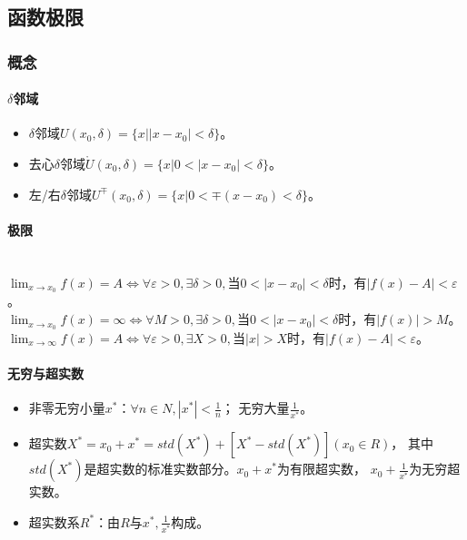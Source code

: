 \documentclass[
12pt, %
a4paper, 
oneside, %
headinclude,footinclude, %
]{scrartcl}
\begin{document}
\subsection[函数极限]{函数极限}
\subsubsection[概念]{概念}
\paragraph{$ \delta $邻域}
\begin{itemize}
\item $ \delta $邻域$ U(x_0, \delta) = \{x||x - x_0| < \delta\} $。
\item 去心$ \delta $邻域$ \mathring{U}(x_0, \delta) = \{x|0 < |x -x _0| < \delta\} $。
\item 左/右$ \delta $邻域$ U^{\mp}(x_0, \delta) = \{x|0 < \mp (x - x_0) < \delta\} $。
\end{itemize}
\paragraph{极限}~\\
$ \lim_{x \to x_0} f(x) = A \Leftrightarrow \forall \varepsilon > 0, \exists \delta > 0, $当$ 0 < |x - x_0|< \delta $时，有$ |f(x) - A| < \varepsilon $。 \\
$ \lim_{x \to x_0} f(x) = \infty \Leftrightarrow \forall M > 0, \exists \delta > 0, $当$ 0 < |x - x_0|< \delta $时，有$ |f(x)| > M $。 \\
$ \lim_{x \to \infty} f(x) = A \Leftrightarrow \forall \varepsilon > 0, \exists X > 0, $当$ |x|> X $时，有$ |f(x) - A| < \varepsilon $。
\paragraph{无穷与超实数}
\begin{itemize}
\item 非零无穷小量$ x^* $：$ \forall n \in N, |x^*| < \frac{1}{n} $；
无穷大量$ \frac{1}{x^*} $。
\item 超实数$ X^* = x_0 + x^* = std(X^*) + [X^* - std(X^*)](x_0 \in R) $，
其中$ std(X^*) $是超实数的标准实数部分。$ x_0 + x^* $为有限超实数，
$ x_0 + \frac{1}{x^*} $为无穷超实数。
\item 超实数系$ R^* $：由$ R $与$ x^*, \frac{1}{x^*} $构成。
\end{itemize}
\end{document}
